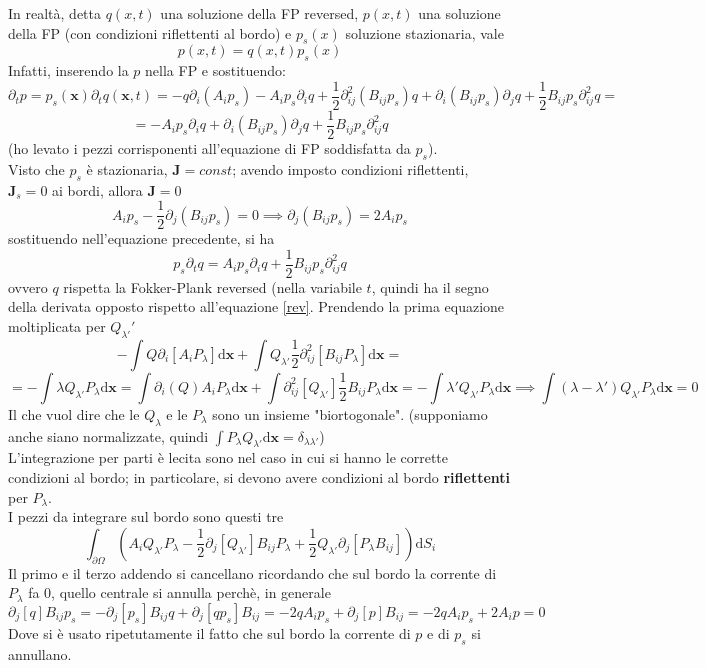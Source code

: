 \documentclass[a4paper,12pt]{article}
\theoremstyle{plain}
\renewcommand{\vec}[1]{{\boldsymbol{#1}}}
\theoremstyle{definition}
\newcommand{\f}[2]{\frac{#1}{#2}}
\newcommand{\tdv}{\partial_t}
\renewcommand{\d}{\text{d}}
\newcommand{\pos}{\vec{x}}
\theoremstyle{remark}
\begin{document}
In realtà, detta $q(x,t)$ una soluzione della FP reversed, $p(x,t)$  una soluzione della FP (con condizioni riflettenti al bordo) e $p_s(x)$ soluzione stazionaria, vale
\[p(x,t)=q(x,t)p_s(x)\] 
Infatti, inserendo la $p$ nella FP e sostituendo:
\[\tdv p=p_s(\pos) \tdv 	q(\pos,t)=-	q \partial_i (A_i p_s)-A_i p_s\partial_iq+\f{1}{2}\partial^2_{ij			}	\left(B_{ij}p_s\right)	q+\partial_{i			}	\left(B_{ij} p_s\right)		\partial_j	q+\f{1}{2}B_{ij} p_s \partial^2_{ij}q=\]
\[=-A_i p_s\partial_iq+\partial_{i			}	\left(B_{ij} p_s\right)		\partial_j	q+\f{1}{2}B_{ij} p_s \partial^2_{ij}q\]
(ho levato i pezzi corrisponenti all'equazione di FP soddisfatta da $p_s$).\\
Visto che $p_s$ è stazionaria, $\vec{J}=const$; avendo imposto condizioni riflettenti, $\vec{J}_s=0$ ai bordi, allora $\vec{J}=0$
\[A_ip_s-	\f{1}{2}\partial_j \left(B_{ij}p_s\right)	=0	\implies \partial_j(B_{ij}p_s)=2A_i p_s\]
sostituendo nell'equazione precedente, si ha
\[p_s\tdv q=A_i p_s \partial_iq+\f{1}{2}B_{ij} p_s \partial^2_{ij}q\]
ovvero $q$ rispetta la Fokker-Plank reversed (nella variabile $t$, quindi ha il segno della derivata opposto rispetto all'equazione \ref{rev}.
Prendendo la prima equazione moltiplicata per $Q_{\lambda'}'$
	\[-\int Q\partial_i	[A_iP_\lambda] \d \pos	+\int Q_{\lambda'} \f{1}{2}\partial^2_{ij}[B_{ij}P_\lambda]\d \pos=\]\[=-\int \lambda  Q_{\lambda'} P_\lambda\d \pos=\int \partial_i	(Q)A_iP_\lambda \d \pos	+\int \partial^2_{ij}[Q_{\lambda'} ]\f{1}{2}B_{ij}P_\lambda\d \pos=-\int \lambda' Q_{\lambda'} P_\lambda\d \pos\implies \int (\lambda-\lambda')Q_{\lambda'}P_\lambda \d \pos=0	\]
Il che vuol dire che le $Q_\lambda$ e le $P_{\lambda}$ sono un insieme "biortogonale". (supponiamo anche siano normalizzate, quindi $\int P_\lambda Q_{\lambda'}\d \pos=\delta_{\lambda\lambda'}$)\\
L'integrazione per parti è lecita sono nel caso in cui si hanno le corrette condizioni al bordo; in particolare, si devono avere condizioni al bordo \textbf{riflettenti} per $P_\lambda$.	\\
I pezzi da integrare sul bordo sono questi tre
\[\int_{\partial \Omega}  \left(A_i Q_{\lambda'} P_\lambda-\f{1}{2}\partial_j [Q_{\lambda'}]B_{ij} P_\lambda+ \f{1}{2}Q_{\lambda'}\partial_j [P_\lambda B_{ij}]	\right)\d S_i
\]
Il primo e il terzo addendo si cancellano  ricordando che sul bordo la corrente di $P_\lambda$ fa 0, quello centrale si annulla perchè, in generale
\[\partial_j [q ]B_{ij} p_s=-\partial_j [p_s]B_{ij} q+\partial_j [q p_s ]B_{ij}=-2q A_ip_s+\partial_j [p] B_{ij}=-2q A_ip_s+2 A_i p=0\]
Dove si è usato ripetutamente il fatto che sul bordo la corrente di $p$ e di $p_s$ si annullano.
\end{document}

